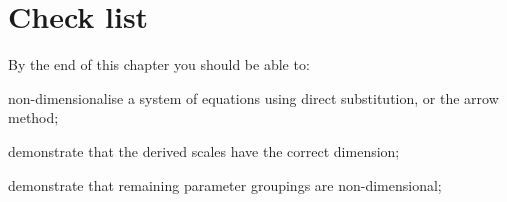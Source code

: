 %
%

\section{Check list}
By the end of this chapter you should be able to:
\begin{todolist}
\item non-dimensionalise a system of equations using direct substitution, or the arrow method;
\item demonstrate that the derived scales have the correct dimension;
\item demonstrate that remaining parameter groupings are non-dimensional;
\end{todolist}




